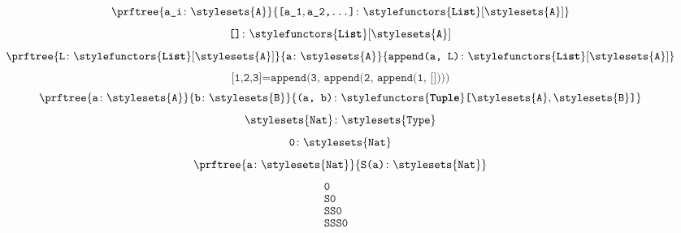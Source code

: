 \begin{forslides}
\begin{equation}
    \end{equation}
    \begin{equation}
        \label{eq:typecon_1_session1_22}
        \prftree{\texttt{a\_i}\colon \stylesets{\texttt{A}}}{\texttt{[a\_1},\texttt{a\_2,\ldots]}\colon \stylefunctors{\textbf{\texttt{List}}}[\stylesets{\texttt{A}}]}
    \end{equation}
    \begin{equation}
        \label{eq:typecon_2_session1_22}
        \texttt{[]}\colon \stylefunctors{\textbf{\texttt{List}}}[\stylesets{\texttt{A}}]
    \end{equation}
    \begin{equation}
        \label{eq:typecon_3_session1_22}
        \prftree{\texttt{L}\colon \stylefunctors{\textbf{\texttt{List}}}[\stylesets{\texttt{A}}]}{\texttt{a}\colon \stylesets{\texttt{A}}}{\texttt{append(a, L)}\colon \stylefunctors{\textbf{\texttt{List}}}[\stylesets{\texttt{A}}]}
    \end{equation}
    \begin{equation}
        \label{eq:typecon_4_session1_22}
        \texttt{[1,2,3]} = \texttt{append(3, append(2, append(1, [])))}
    \end{equation}
    \begin{equation}
        \label{eq:typecon_5_session1_22}
        \prftree{\texttt{a}\colon \stylesets{\texttt{A}}}
        {\texttt{b}\colon \stylesets{\texttt{B}}}
        {\texttt{(a, b)}\colon \stylefunctors{\textbf{\texttt{Tuple}}}\texttt{[}\stylesets{\texttt{A}},\stylesets{\texttt{B}}\texttt{]}}
    \end{equation}
    \begin{equation}
        \label{eq:typecon_6_session1_22}
        \stylesets{\texttt{Nat}}\colon \stylesets{\texttt{Type}}
    \end{equation}
    \begin{equation}
        \label{eq:typecon_7_session1_22}
        \texttt{0}\colon \stylesets{\texttt{Nat}}
    \end{equation}
    \begin{equation}
        \label{eq:typecon_8_session1_22}
        \prftree{\texttt{a}\colon \stylesets{\texttt{Nat}}}
        {\texttt{S(a)}\colon \stylesets{\texttt{Nat}}}
    \end{equation}
    \begin{equation}
        \label{eq:typecon_9_session1_22}
        \begin{aligned}
            \texttt{0}    & \\
            \texttt{S0}   & \\
            \texttt{SS0}  & \\
            \texttt{SSS0} &
        \end{aligned}
    \end{equation}


\end{forslides}
